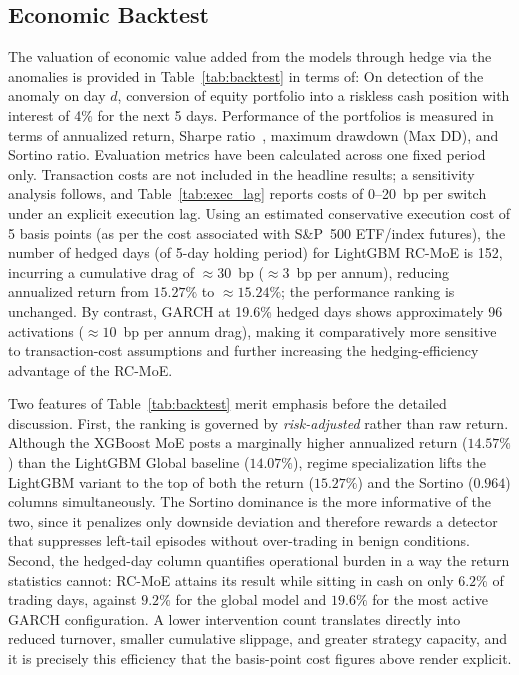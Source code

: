 \documentclass[]{interact}
\begin{document}
\subsection{Economic Backtest}
\label{subsec:backtest}
The valuation of economic value added from the models through hedge via the anomalies is provided in Table~\ref{tab:backtest} in terms of: On detection of the anomaly on day $d$, conversion of equity portfolio into a riskless cash position with interest of 4\% for the next 5 days. Performance of the portfolios is measured in terms of annualized return, Sharpe ratio~\citep{sharpe1966mutual}, maximum drawdown (Max DD), and Sortino ratio. Evaluation metrics have been calculated across one fixed period only. Transaction costs are not included in the headline results; a sensitivity analysis follows, and Table~\ref{tab:exec_lag} reports costs of 0--20~bp per switch under an explicit execution lag. Using an estimated conservative execution cost of 5 basis points (as per the cost associated with S\&P~500 ETF/index futures), the number of hedged days (of 5-day holding period) for LightGBM RC-MoE is 152, incurring a cumulative drag of ${\approx}30$~bp (${\approx}3$~bp per annum), reducing annualized return from $15.27\%$ to ${\approx}15.24\%$; the performance ranking is unchanged. By contrast, GARCH at 19.6\% hedged days shows approximately 96 activations (${\approx}10$~bp per annum drag), making it comparatively more sensitive to transaction-cost assumptions and further increasing the hedging-efficiency advantage of the RC-MoE.

Two features of Table~\ref{tab:backtest} merit emphasis before the detailed discussion. First, the ranking is governed by \emph{risk-adjusted} rather than raw return. Although the XGBoost MoE posts a marginally higher annualized return ($14.57\%$) than the LightGBM Global baseline ($14.07\%$), regime specialization lifts the LightGBM variant to the top of both the return ($15.27\%$) and the Sortino ($0.964$) columns simultaneously. The Sortino dominance is the more informative of the two, since it penalizes only downside deviation and therefore rewards a detector that suppresses left-tail episodes without over-trading in benign conditions. Second, the hedged-day column quantifies operational burden in a way the return statistics cannot: RC-MoE attains its result while sitting in cash on only $6.2\%$ of trading days, against $9.2\%$ for the global model and $19.6\%$ for the most active GARCH configuration. A lower intervention count translates directly into reduced turnover, smaller cumulative slippage, and greater strategy capacity, and it is precisely this efficiency that the basis-point cost figures above render explicit.
\end{document}
